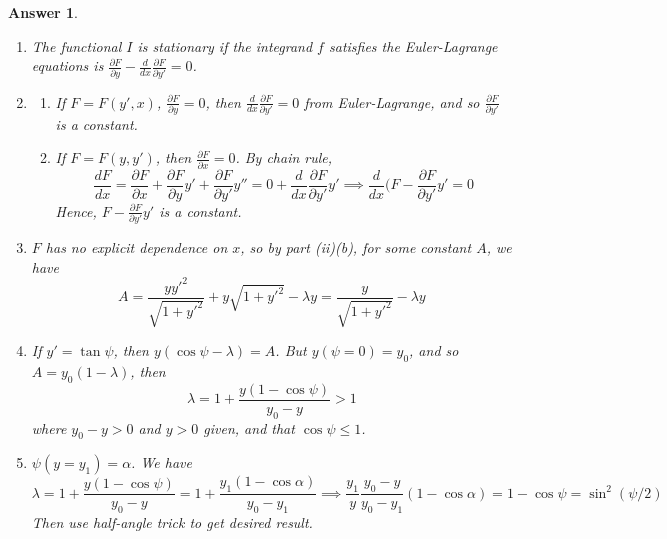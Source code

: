 \documentclass[a4paper]{article}
\newtheorem{ans}{Answer}[section]
\theoremstyle{new}
\begin{document}
\begin{ans}\leavevmode
\begin{enumerate}[label=(\roman*)]
\item The functional $I$ is stationary if the integrand $f$ satisfies the Euler-Lagrange equations is $\frac{\partial F}{\partial y}-\frac{d}{dx}\frac{\partial F}{\partial y'}=0$.
\item 
\begin{enumerate}[label=(\alph*)]
\item If $F=F(y',x)$, $\frac{\partial F}{\partial y}=0$, then $\frac{d}{dx}\frac{\partial F}{\partial y'}=0$ from Euler-Lagrange, and so $\frac{\partial F}{\partial y'}$ is a constant.
\item If $F=F(y,y')$, then $\frac{\partial F}{\partial x}=0$. By chain rule, 
$$\frac{dF}{dx}=\frac{\partial F}{\partial x}+\frac{\partial F}{\partial y}y'+\frac{\partial F}{\partial y'}y''=0+\frac{d}{dx}\frac{\partial F}{\partial y'}y'\implies\frac{d}{dx}\bigg(F-\frac{\partial F}{\partial y'}y'=0$$
Hence, $F-\frac{\partial F}{\partial y'}y'$ is a constant.
\end{enumerate}
\item $F$ has no explicit dependence on $x$, so by part (ii)(b), for some constant $A$, we have
$$A=\frac{yy'^2}{\sqrt{1+y'^2}}+y\sqrt{1+y'^2}-\lambda y=\frac{y}{\sqrt{1+y'^2}}-\lambda y$$
\item If $y'=\tan\psi$, then $y(\cos\psi-\lambda)=A$. But $y(\psi=0)=y_0$, and so $A=y_0(1-\lambda)$, then 
$$\lambda=1+\frac{y(1-\cos\psi)}{y_0-y}>1$$
where $y_0-y>0$ and $y>0$ given, and that $\cos\psi\leq 1$.
\item $\psi(y=y_1)=\alpha$. We have
$$\lambda=1+\frac{y(1-\cos\psi)}{y_0-y}=1+\frac{y_1(1-\cos\alpha)}{y_0-y_1}\implies \frac{y_1}{y}\frac{y_0-y}{y_0-y_1}(1-\cos\alpha)=1-\cos\psi=\sin^2(\psi/2)$$
Then use half-angle trick to get desired result.
\end{enumerate}
\end{ans}
\newpage
\end{document}
